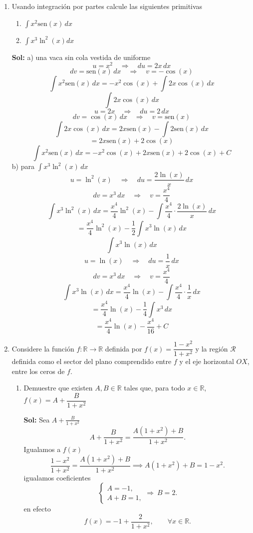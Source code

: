 \documentclass[letterpaper,12pt]{article}
\theoremstyle{plain}
\theoremstyle{definition}
\newcommand{\sen}{\text{sen}}
\begin{document}
\begin{enumerate}

\item Usando integración por partes calcule las siguientes primitivas
\begin{enumerate}
    \item $\displaystyle \int x^2 \sen(x) \, dx$
    \item $\displaystyle \int x^3 \ln^2(x) dx$
\end{enumerate}

\color{blue}
\textbf{Sol:} a) una vaca sin cola vestida de uniforme
\[
u = x^2 \quad \Rightarrow \quad du = 2x\,dx
\]
\[
dv = \sen(x)\,dx \quad \Rightarrow \quad v = -\cos(x)
\]
\[
\int x^2 \sen(x)\,dx
= -x^2\cos(x) + \int 2x\cos(x)\,dx
\]
\[
\int 2x\cos(x)\,dx
\]
\[
u = 2x \quad \Rightarrow \quad du = 2\,dx
\]
\[
dv = \cos(x)\,dx \quad \Rightarrow \quad v = \sen(x)
\]
\[
\int 2x\cos(x)\,dx
= 2x\sen(x) - \int 2\sen(x)\,dx
\]
\[
= 2x\sen(x) + 2\cos(x)
\]
\[
\int x^2 \sen(x)\,dx
= -x^2\cos(x) + 2x\sen(x) + 2\cos(x) + C
\]
b) para $\displaystyle 
\int x^3 \ln^2(x)\,dx$
\[
u = \ln^2(x) \quad \Rightarrow \quad du = \frac{2\ln(x)}{x}\,dx
\]
\[
dv = x^3\,dx \quad \Rightarrow \quad v = \frac{x^4}{4}
\]
\[
\int x^3 \ln^2(x)\,dx
= \frac{x^4}{4}\ln^2(x) - \int \frac{x^4}{4}\cdot\frac{2\ln(x)}{x}\,dx
\]
\[
= \frac{x^4}{4}\ln^2(x) - \frac{1}{2}\int x^3\ln(x)\,dx
\]
\[
\int x^3\ln(x)\,dx
\]
\[
u = \ln(x) \quad \Rightarrow \quad du = \frac{1}{x}\,dx
\]
\[
dv = x^3\,dx \quad \Rightarrow \quad v = \frac{x^4}{4}
\]
\[
\int x^3\ln(x)\,dx
= \frac{x^4}{4}\ln(x) - \int \frac{x^4}{4}\cdot\frac{1}{x}\,dx
\]
\[
= \frac{x^4}{4}\ln(x) - \frac{1}{4}\int x^3\,dx
\]
\[
= \frac{x^4}{4}\ln(x) - \frac{x^4}{16} +C
\]

\color{black}

\item Considere la función $f : \mathbb{R} \to \mathbb{R}$ definida por $f(x) = \dfrac{1 - x^2}{1 + x^2}$ y la región $\mathcal{R}$ definida como el sector del plano comprendido entre $f$ y el eje horizontal $OX$, entre los ceros de $f$.
\begin{enumerate}
    \item Demuestre que existen $A, B \in \mathbb{R}$ tales que, para todo $x \in \mathbb{R}$, $f(x) = A + \dfrac{B}{1 + x^2}$

    \color{blue}
    \textbf{Sol:} Sea $\displaystyle A+\frac{B}{1+x^2}$
\[
A+\frac{B}{1+x^2}=\frac{A(1+x^2)+B}{1+x^2}.
\]
Igualamos a $f(x)$
\[
\dfrac{1 - x^2}{1 + x^2}=\frac{A(1+x^2)+B}{1+x^2} \implies
A(1+x^2)+B=1-x^2.
\]
igualamos coeficientes
\[
\begin{cases}
A= -1,\\
A+B=1,
\end{cases}
\Rightarrow\ B=2.
\]
en efecto
\[
f(x)=-1+\frac{2}{1+x^2}, \qquad \forall x\in\mathbb{R}.
\]
    \color{black}
    

\end{enumerate}
\end{enumerate}
\end{document}
